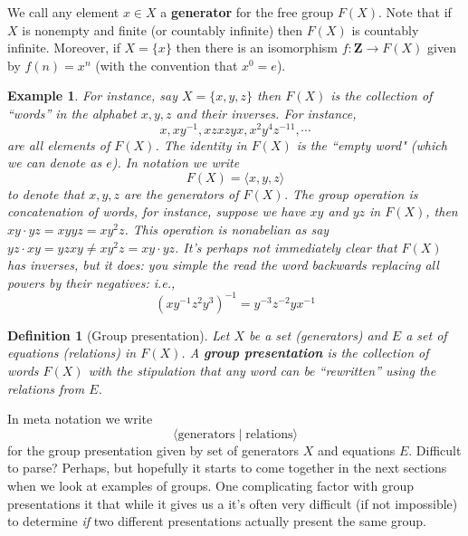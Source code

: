 \documentclass[12pt]{article}
\numberwithin{equation}{subsection}
\newtheorem{defn}[subsection]{Definition}
\theoremstyle{note}
\newtheorem{example}[subsection]{Example}
\begin{document}
We call any element $x\in X$ a \textbf{generator} for the free group $F(X)$. Note that if $X$ is nonempty and finite (or countably infinite) then $F(X)$ is countably infinite. Moreover, if $X=\{x\}$ then there is an isomorphism $f\colon \mathbf{Z}\to F(X)$ given by $f(n)=x^n$ (with the convention that $x^0=e$). 

\begin{example}For instance, say $X=\{x,y,z\}$ then $F(X)$ is the collection of ``words'' in the alphabet $x,y,z$ and their inverses. For instance, \[ x, xy^{-1}, xzxzyx, x^2y^4z^{-11}, \cdots\] are all elements of $F(X)$.  The identity in $F(X)$ is the ``empty word" (which we can denote as $e$). In notation we write \[ F(X)=\langle x,y,z \rangle\] to denote that $x,y,z$ are the generators of $F(X)$. The group operation is concatenation of words, for instance, suppose we have $xy$ and $yz$ in $F(X)$, then $xy\cdot yz=xyyz=xy^2z$. This operation is nonabelian as say $yz\cdot xy=yzxy\neq xy^2z=xy\cdot yz$. It's perhaps not immediately clear that $F(X)$ has inverses, but it does: you simple the read the word backwards replacing all powers by their negatives: i.e., \[ (xy^{-1}z^2y^3)^{-1}=y^{-3}z^{-2}yx^{-1}\]

\end{example}


\begin{defn}[Group presentation]
	Let $X$ be a set (generators) and $E$ a set of equations (relations) in $F(X)$. A \textbf{group presentation} is the collection of words $F(X)$ with the stipulation that any word can be ``rewritten'' using the relations from $E$.%
\end{defn}
In meta notation we write \begin{equation} \langle \text{generators} \mid \text{relations} \rangle\end{equation} for the group presentation given by set of generators $X$ and equations $E$. 
Difficult to parse? Perhaps, but hopefully it starts to come together in the next sections when we look at examples of groups. One complicating factor with group presentations it that while it gives us a  it's often very difficult (if not impossible) to determine \textit{if} two different presentations actually present the same group. 
\end{document}
